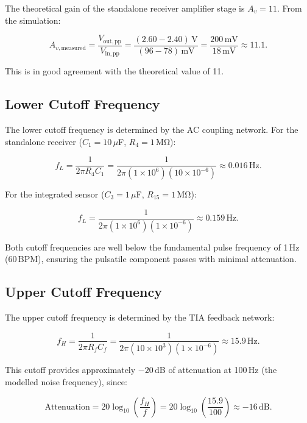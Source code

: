 \documentclass[10pt]{article}
\begin{document}
The theoretical gain of the standalone receiver amplifier stage is $A_v = 11$. From the simulation:

\begin{equation}
A_{v,\mathrm{measured}}
=
\frac{V_{\mathrm{out,pp}}}{V_{\mathrm{in,pp}}}
=
\frac{(2.60 - 2.40)\,\mathrm{V}}{(96 - 78)\,\mathrm{mV}}
=
\frac{200\,\mathrm{mV}}{18\,\mathrm{mV}}
\approx 11.1.
\end{equation}

This is in good agreement with the theoretical value of 11.

\subsection{Lower Cutoff Frequency}

The lower cutoff frequency is determined by the AC coupling network. For the standalone receiver ($C_1 = 10\,\mu$F, $R_4 = 1\,\mathrm{M\Omega}$):

\begin{equation}
f_L=\frac{1}{2\pi R_4 C_1} = \frac{1}{2\pi(1\times10^6)(10\times10^{-6})} \approx 0.016\,\mathrm{Hz}.
\end{equation}

For the integrated sensor ($C_3 = 1\,\mu$F, $R_{15} = 1\,\mathrm{M\Omega}$):

\begin{equation}
f_L = \frac{1}{2\pi(1\times10^6)(1\times10^{-6})} \approx 0.159\,\mathrm{Hz}.
\end{equation}

Both cutoff frequencies are well below the fundamental pulse frequency of 1\,Hz (60\,BPM), ensuring the pulsatile component passes with minimal attenuation.

\subsection{Upper Cutoff Frequency}

The upper cutoff frequency is determined by the TIA feedback network:

\begin{equation}
f_H=\frac{1}{2\pi R_f C_f} = \frac{1}{2\pi(10\times10^3)(1\times10^{-6})} \approx 15.9\,\mathrm{Hz}.
\end{equation}

This cutoff provides approximately $-20$\,dB of attenuation at 100\,Hz (the modelled noise frequency), since:

\begin{equation}
\text{Attenuation} = 20\log_{10}\left(\frac{f_H}{f}\right) = 20\log_{10}\left(\frac{15.9}{100}\right) \approx -16\,\mathrm{dB}.
\end{equation}
\end{document}
